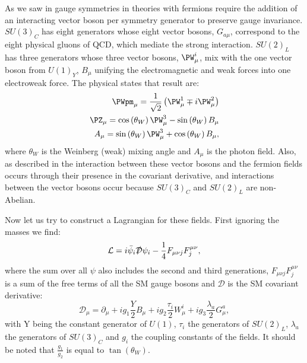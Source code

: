 As we saw in  gauge symmetries in theories with fermions require the addition of an interacting vector boson per symmetry generator to preserve gauge invariance. $SU\!\left(3\right)_{C}$ has eight generators whose eight vector bosons, $G_{a\mu}$, correspond to the eight physical gluons of \ac{QCD}, which mediate the strong interaction. $SU\!\left(2\right)_{L}$ has three generators whose three vector bosons, $\PW^{i}_{\mu}$, mix with the one vector boson from $U\!\left(1\right)_{Y}$, $B_{\mu}$ unifying the electromagnetic and weak forces into one electroweak force. The physical states that result are:
\begin{equation}
  \begin{split}
  \PWpm_{\mu}=\frac{1}{\sqrt{2}}\left(\PW^{1}_{\mu}\mp i\PW^{2}_{\mu}\right) \\
  \PZ_{\mu}=\cos\left(\theta_{W}\right)\PW^{3}_{\mu}-\sin\left(\theta_{W}\right)B_{\mu} \\
  A_{\mu}=\sin\left(\theta_{W}\right)\PW^{3}_{\mu}+\cos\left(\theta_{W}\right)B_{\mu},
  \end{split}
\end{equation}
where $\theta_{W}$ is the Weinberg (weak) mixing angle and $A_{\mu}$ is the photon field. Also, as described in  the interaction between these vector bosons and the fermion fields occurs through their presence in the covariant derivative, and interactions between the vector bosons occur because $SU\!\left(3\right)_{C}$ and $SU\!\left(2\right)_{L}$ are non-Abelian.

Now let us try to construct a Lagrangian for these fields. First ignoring the masses we find:
\begin{equation}
  \mathcal{L}=i\bar{\psi}_{i}\slashed{\mathcal{D}}\psi_{i}-\frac{1}{4}F_{\mu\nu j}F^{\mu\nu}_{j},
\end{equation}
where the sum over all $\psi$ also includes the second and third generations, $F_{\mu\nu j}F^{\mu\nu}_{j}$ is a sum of the free terms of all the SM gauge bosons and $\mathcal{D}$ is the SM covariant derivative:
\begin{equation}
  \mathcal{D_{\mu}}=\partial_{\mu}+ig_{1}\frac{Y}{2}B_{\mu}+ig_{2}\frac{\tau_{i}}{2}W_{\mu}^{i}+ig_{3}\frac{\lambda_{a}}{2}G_{\mu}^{a},
\end{equation}
with Y being the constant generator of $U\!\left(1\right)$, $\tau_{i}$ the generators of $SU\!\left(2\right)_{L}$, $\lambda_{a}$ the generators of $SU\!\left(3\right)_{C}$ and $g_{i}$ the coupling constants of the fields. It should be noted that $\frac{g_{1}}{g_{2}}$ is equal to $\tan\left(\theta_{W}\right)$.

